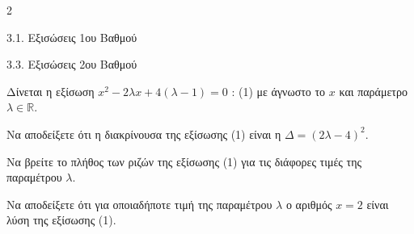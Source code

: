 \begin{ylh}{2}
    \item 3.1. Εξισώσεις 1ου Βαθμού
    \item 3.3. Εξισώσεις 2ου Βαθμού
\end{ylh}
Δίνεται η εξίσωση $x^2 - 2\lambda x + 4(\lambda - 1) = 0$ : (1) με άγνωστο το $x$ και παράμετρο $\lambda \in \mathbb{R}$.

\begin{alist}
\item Να αποδείξετε ότι η διακρίνουσα της εξίσωσης (1) είναι η $\Delta = (2\lambda - 4)^2$.
\item Να βρείτε το πλήθος των ριζών της εξίσωσης (1) για τις διάφορες τιμές της παραμέτρου $\lambda$.
\item Να αποδείξετε ότι για οποιαδήποτε τιμή της παραμέτρου $\lambda$ ο αριθμός $x = 2$ είναι λύση της εξίσωσης (1).
\end{alist}

